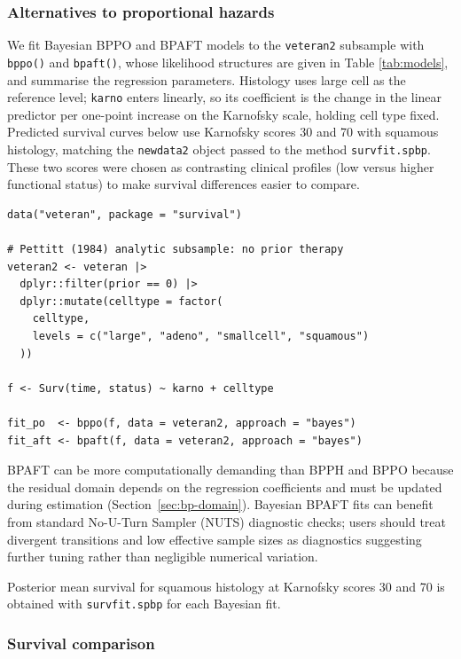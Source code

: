 \documentclass[5p,lefttitle]{elsarticle}
\begin{document}
{\subsubsection{Alternatives to proportional hazards}\label{sec:alternatives}

We fit Bayesian BPPO and BPAFT models to the \texttt{veteran2} subsample
with \texttt{bppo()} and \texttt{bpaft()}, whose likelihood structures are given in
Table \ref{tab:models}, and summarise the regression parameters.
Histology uses large cell as the reference level; \texttt{karno} enters
linearly, so its coefficient is the change in the linear predictor per
one-point increase on the Karnofsky scale, holding cell type fixed.
Predicted survival curves below use Karnofsky scores 30 and 70 with
squamous histology, matching the \texttt{newdata2} object passed to
the method \texttt{survfit.spbp}. These two scores were chosen as contrasting clinical
profiles (low versus higher functional status) to make survival
differences easier to compare.

{\footnotesize\begin{verbatim}
data("veteran", package = "survival")

# Pettitt (1984) analytic subsample: no prior therapy
veteran2 <- veteran |>
  dplyr::filter(prior == 0) |>
  dplyr::mutate(celltype = factor(
    celltype,
    levels = c("large", "adeno", "smallcell", "squamous")
  ))

f <- Surv(time, status) ~ karno + celltype

fit_po  <- bppo(f, data = veteran2, approach = "bayes")
fit_aft <- bpaft(f, data = veteran2, approach = "bayes")
\end{verbatim}}

BPAFT can be more computationally demanding than BPPH and BPPO because
the residual domain depends on the regression coefficients and must be
updated during estimation (Section~\ref{sec:bp-domain}). Bayesian BPAFT
fits can benefit from standard No-U-Turn Sampler (NUTS) diagnostic checks; users should treat
divergent transitions and low effective sample sizes as diagnostics
suggesting further tuning rather than negligible numerical variation.

Posterior mean survival for squamous histology at Karnofsky scores
30 and 70 is obtained with \texttt{survfit.spbp} for each
Bayesian fit.

\subsubsection{Survival comparison}\label{survival-comparison}

}
\end{document}
